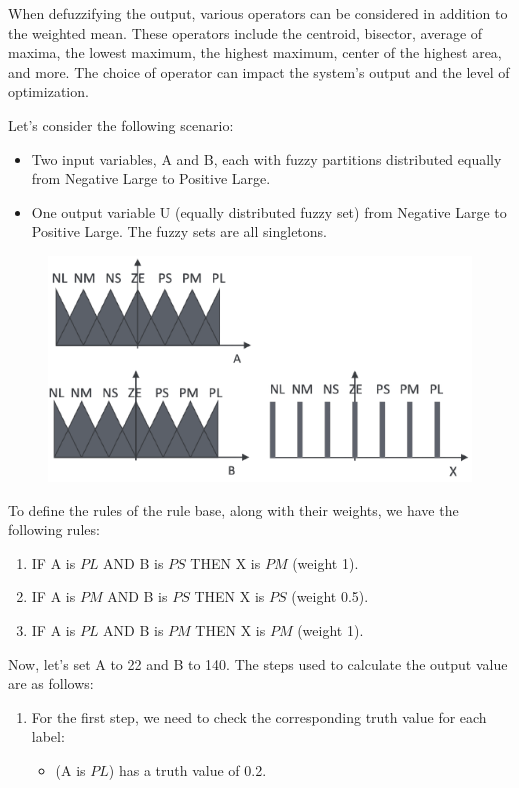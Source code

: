 \documentclass[12pt, a4paper]{report}
\begin{document}
    When defuzzifying the output, various operators can be considered in addition to the weighted mean. 
    These operators include the centroid, bisector, average of maxima, the lowest maximum, the highest maximum, center of the highest area, and more. 
    The choice of operator can impact the system's output and the level of optimization.
    \begin{example}
        Let's consider the following scenario:
        \begin{itemize}
            \item Two input variables, A and B, each with fuzzy partitions distributed equally from Negative Large to Positive Large.
            \item One output variable U (equally distributed fuzzy set) from Negative Large to Positive Large. The fuzzy sets are all singletons.
        \end{itemize} 
        \begin{figure}[H]
            \centering
            \includegraphics[width=0.5\linewidth]{images/rules.png}
        \end{figure}
        To define the rules of the rule base, along with their weights, we have the following rules:
        \begin{enumerate}
            \item IF A is $PL$ AND B is $PS$ THEN X is $PM$ (weight 1).
            \item IF A is $PM$ AND B is $PS$ THEN X is $PS$ (weight 0.5).
            \item IF A is $PL$ AND B is $PM$ THEN X is $PM$ (weight 1).
        \end{enumerate}
        Now, let's set A to 22 and B to 140. 
        The steps used to calculate the output value are as follows:
        \begin{enumerate}
            \item For the first step, we need to check the corresponding truth value for each label:
                \begin{itemize}
                    \item (A is $PL$) has a truth value of 0.2.

\end{itemize}
\end{enumerate}
\end{example}
\end{document}
